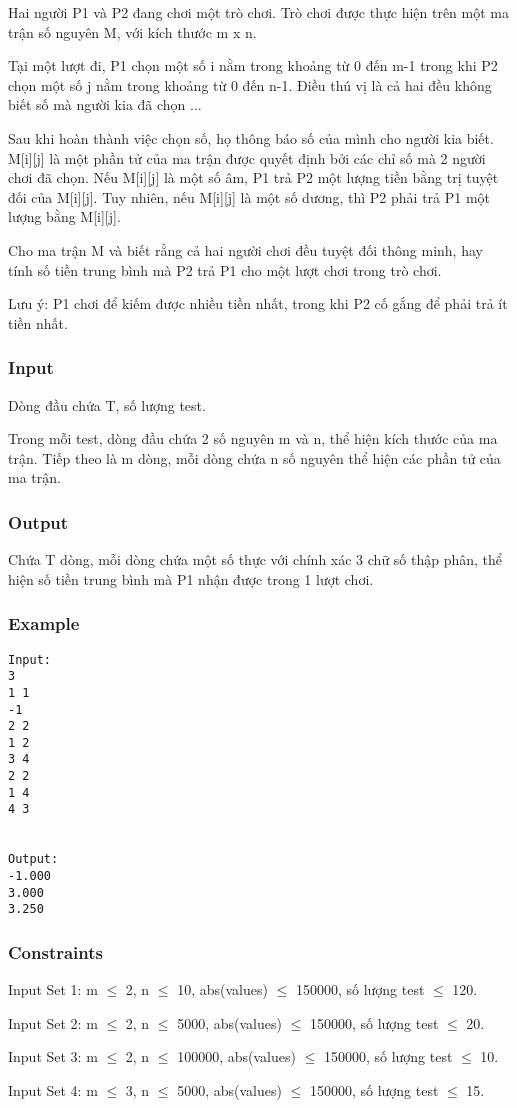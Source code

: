 



   Hai người P1 và P2 đang chơi một trò chơi. Trò chơi được thực hiện trên một ma trận số nguyên M, với kích thước m x n.  

   Tại một lượt đi, P1 chọn một số i nằm trong khoảng từ 0 đến m-1 trong khi P2 chọn một số j nằm trong khoảng từ 0 đến n-1. Điều thú vị là cả hai đều không biết số mà người kia đã chọn ...  

   Sau khi hoàn thành việc chọn số, họ thông báo số của mình cho người kia biết. M[i][j] là một phần tử của ma trận được quyết định bởi các chỉ số mà 2 người chơi đã chọn. Nếu M[i][j] là một số âm, P1 trả P2 một lượng tiền bằng trị tuyệt đối của M[i][j]. Tuy nhiên, nếu M[i][j] là một số dương, thì P2 phải trả P1 một lượng bằng M[i][j].  

   Cho ma trận M và biết rằng cả hai người chơi đều tuyệt đối thông minh, hay tính số tiền trung bình mà P2 trả P1 cho một lượt chơi trong trò chơi.  

   Lưu ý: P1 chơi để kiếm được nhiều tiền nhất, trong khi P2 cố gắng để phải trả ít tiền nhất.  

\subsubsection{   Input  }

   Dòng đầu chứa T, số lượng test.  

   Trong mỗi test, dòng đầu chứa 2 số nguyên m và n, thể hiện kích thước của ma trận. Tiếp theo là m dòng, mỗi dòng chứa n số nguyên thể hiện các phần tử của ma trận.  

\subsubsection{   Output  }

   Chứa T dòng, mỗi dòng chứa một số thực với chính xác 3 chữ số thập phân, thể hiện số tiền trung bình mà P1 nhận được trong 1 lượt chơi.  

\subsubsection{   Example  }
\begin{verbatim}
Input:
3
1 1
-1
2 2
1 2
3 4
2 2
1 4
4 3


Output:
-1.000
3.000
3.250
\end{verbatim}

\subsubsection{   Constraints  }

   Input Set 1: m  $\le$  2, n  $\le$  10, abs(values)  $\le$  150000, số lượng test  $\le$  120.  

   Input Set 2: m  $\le$  2, n  $\le$  5000, abs(values)  $\le$  150000, số lượng test  $\le$  20.  

   Input Set 3: m  $\le$  2, n  $\le$  100000, abs(values)  $\le$  150000, số lượng test  $\le$  10.  

   Input Set 4: m  $\le$  3, n  $\le$  5000, abs(values)  $\le$  150000, số lượng test  $\le$  15.  
